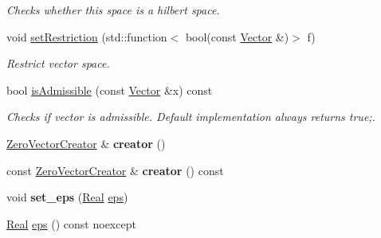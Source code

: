 \begin{DoxyCompactItemize}
\begin{DoxyCompactList}\small\item\em Checks whether this space is a hilbert space. \end{DoxyCompactList}\item 
void \hyperlink{classSpacy_1_1VectorSpace_a7c5f4a8c5937f9e07592483666b20ef7}{set\-Restriction} (std\-::function$<$ bool(const \hyperlink{classSpacy_1_1Vector}{Vector} \&)$>$ f)
\begin{DoxyCompactList}\small\item\em Restrict vector space. \end{DoxyCompactList}\item 
\hypertarget{classSpacy_1_1VectorSpace_a4beac78b082a364eb97e938b6c4928d2}{bool \hyperlink{classSpacy_1_1VectorSpace_a4beac78b082a364eb97e938b6c4928d2}{is\-Admissible} (const \hyperlink{classSpacy_1_1Vector}{Vector} \&x) const }\label{classSpacy_1_1VectorSpace_a4beac78b082a364eb97e938b6c4928d2}

\begin{DoxyCompactList}\small\item\em Checks if vector is admissible. Default implementation always returns true;. \end{DoxyCompactList}\item 
\hypertarget{classSpacy_1_1VectorSpace_a254d66fbb07d0abfaa583aba520d3dc3}{\hyperlink{classSpacy_1_1ZeroVectorCreator}{Zero\-Vector\-Creator} \& {\bfseries creator} ()}\label{classSpacy_1_1VectorSpace_a254d66fbb07d0abfaa583aba520d3dc3}

\item 
\hypertarget{classSpacy_1_1VectorSpace_acc3d5b5210cc810d8011e8a4308150e7}{const \hyperlink{classSpacy_1_1ZeroVectorCreator}{Zero\-Vector\-Creator} \& {\bfseries creator} () const }\label{classSpacy_1_1VectorSpace_acc3d5b5210cc810d8011e8a4308150e7}

\item 
\hypertarget{classSpacy_1_1Mixin_1_1Eps_a818ab6dfab5e4eea583e1302bcc621f8}{void {\bfseries set\-\_\-eps} (\hyperlink{classSpacy_1_1Real}{Real} \hyperlink{classSpacy_1_1Mixin_1_1Eps_a812b99b0abc1d78a34b4114907f23f52}{eps})}\label{classSpacy_1_1Mixin_1_1Eps_a818ab6dfab5e4eea583e1302bcc621f8}

\item 
\hypertarget{classSpacy_1_1Mixin_1_1Eps_a812b99b0abc1d78a34b4114907f23f52}{\hyperlink{classSpacy_1_1Real}{Real} \hyperlink{classSpacy_1_1Mixin_1_1Eps_a812b99b0abc1d78a34b4114907f23f52}{eps} () const noexcept}\label{classSpacy_1_1Mixin_1_1Eps_a812b99b0abc1d78a34b4114907f23f52}


\end{DoxyCompactItemize}
